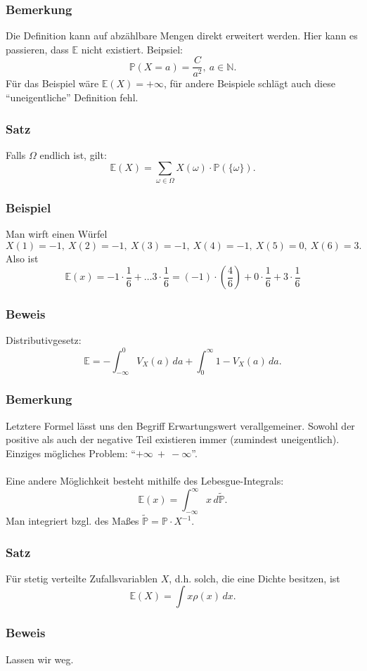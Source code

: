\subsubsection{Bemerkung}
Die Definition kann auf abz\"ahlbare Mengen direkt erweitert werden. Hier kann es passieren, dass $\mathbb{E}$ nicht existiert. Beipsiel:
\[\mathbb{P}(X=a)=\frac{C}{a^2},\ a\in\mathbb{N}.\]
F\"ur das Beispiel w\"are $\mathbb{E}(X)=+\infty$, f\"ur andere Beispiele schl\"agt auch diese ``uneigentliche'' Definition fehl.
\subsubsection{Satz}
Falls $\Omega$ endlich ist, gilt:
\[\mathbb{E}(X)=\sum_{\omega\in\Omega}X(\omega)\cdot\mathbb{P}(\{\omega\}).\]
\subsubsection{Beispiel}
Man wirft einen W\"urfel
\[X(1)=-1,\ X(2)=-1,\ X(3)=-1,\ X(4)=-1,\ X(5)=0,\ X(6)=3.\]
Also ist
\[\mathbb{E}(x)=-1\cdot\frac{1}{6}+\ldots3\cdot\frac{1}{6}=(-1)\cdot(\frac{4}{6})+0\cdot\frac{1}{6}+3\cdot\frac{1}{6}\]
\subsubsection{Beweis}
Distributivgesetz:
\[\mathbb{E}=-\int_{-\infty}^{0}V_X(a)\,da+\int_0^\infty1-V_X(a)\,da.\]
\subsubsection{Bemerkung}
Letztere Formel l\"asst uns den Begriff Erwartungswert verallgemeiner. Sowohl der positive als auch der negative Teil existieren immer (zumindest uneigentlich). Einziges m\"ogliches Problem: ``$+\infty\ +\ -\infty$''.
\\~\\
Eine andere M\"oglichkeit besteht mithilfe des Lebesgue-Integrals:
\[\mathbb{E}(x)=\int_{-\infty}^{\infty}x\,d\widetilde{\mathbb{P}}.\]
Man integriert bzgl. des Ma\ss{}es $\widetilde{\mathbb{P}}=\mathbb{P}\cdot X^{-1}$.
\subsubsection{Satz}
F\"ur stetig verteilte Zufallsvariablen $X$, d.h. solch, die eine Dichte besitzen, ist
\[\mathbb{E}(X)=\int x\rho(x)\,dx.\]
\subsubsection{Beweis}
Lassen wir weg.
